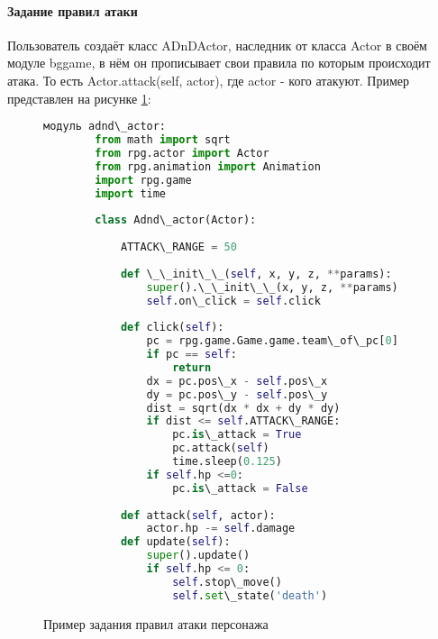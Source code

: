 \paragraph{Задание правил атаки}
Пользователь создаёт класс ADnDActor, наследник от класса Actor в своём модуле bggame, в нём он прописывает свои правила по которым происходит атака. То есть Actor.attack(self, actor), где actor - кого атакуют.
Пример представлен на рисунке \ref{attack:image}:
\begin{figure}[H]
	\begin{lstlisting}[language=Python]
		модуль adnd\_actor:
		from math import sqrt
		from rpg.actor import Actor
		from rpg.animation import Animation
		import rpg.game
		import time
		
		class Adnd\_actor(Actor):
		
			ATTACK\_RANGE = 50
		
			def \_\_init\_\_(self, x, y, z, **params):
				super().\_\_init\_\_(x, y, z, **params)
				self.on\_click = self.click
			
			def click(self):
				pc = rpg.game.Game.game.team\_of\_pc[0]
				if pc == self:
					return
				dx = pc.pos\_x - self.pos\_x
				dy = pc.pos\_y - self.pos\_y
				dist = sqrt(dx * dx + dy * dy)
				if dist <= self.ATTACK\_RANGE:
					pc.is\_attack = True
					pc.attack(self)
					time.sleep(0.125)
				if self.hp <=0:
					pc.is\_attack = False
		
			def attack(self, actor):
				actor.hp -= self.damage
			def update(self):
				super().update()
				if self.hp <= 0:
					self.stop\_move()
					self.set\_state('death')
\end{lstlisting}  
\caption{Пример задания правил атаки персонажа}
\label{attack:image}
\end{figure}

